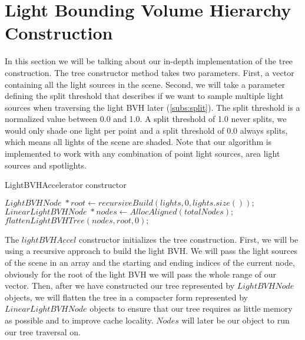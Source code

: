 \section{Light Bounding Volume Hierarchy Construction}
\label{sec:alg:con}

In this section we will be talking about our in-depth implementation of the tree construction. The tree constructor method takes two parameters. First, a vector containing all the light sources in the scene. Second, we will take a parameter defining the split threshold that describes if we want to sample multiple light sources when traversing the light BVH later (\ref{subs:split}). The split threshold is a normalized value between 0.0 and 1.0. A split threshold of 1.0 never splits, we would only shade one light per point and a split threshold of 0.0 always splits, which means all lights of the scene are shaded. Note that our algorithm is implemented to work with any combination of point light sources, area light sources and spotlights.

\begin{algorithm}
	\caption{LightBVHAccelerator constructor}
	\label{LightBVHAccelerator}
	\begin{algorithmic}[1] %
		\State $LightBVHNode \; *root  \gets recursiveBuild(lights, 0, lights.size());$
		\State $LinearLightBVHNode \; *nodes \gets AllocAligned(totalNodes);$ 
		\State $flattenLightBVHTree(nodes, root, 0);$
		\EndProcedure
	\end{algorithmic}
\end{algorithm}

The $lightBVHAccel$ constructor initializes the tree construction. First, we will be using a recursive approach to build the light BVH. We will pass the light sources of the scene in an array and the starting and ending indices of the current node, obviously for the root of the light BVH we will pass the whole range of our vector. Then, after we have constructed our tree represented by $LightBVHNode$ objects, we will flatten the tree in a compacter form represented by $LinearLightBVHNode$ objects to ensure that our tree requires as little memory as possible and to improve cache locality. $Nodes$ will later be our object to run our tree traversal on.


